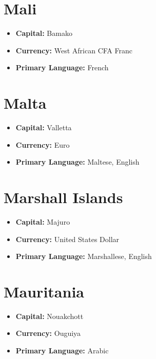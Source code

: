 \documentclass[a4paper,100pt,twoside]{book}
\begin{document}
\section*{\Huge Mali}
\vspace{5mm} %
\begin{itemize}
	\item \textbf{Capital:} Bamako
	\item \textbf{Currency:} West African CFA Franc
	\item \textbf{Primary Language:} French
\end{itemize}

\section*{\Huge Malta}
\vspace{5mm} %
\begin{itemize}
	\item \textbf{Capital:} Valletta
	\item \textbf{Currency:} Euro
	\item \textbf{Primary Language:} Maltese, English
\end{itemize}

\section*{\Huge Marshall Islands}
\vspace{5mm} %
\begin{itemize}
	\item \textbf{Capital:} Majuro
	\item \textbf{Currency:} United States Dollar
	\item \textbf{Primary Language:} Marshallese, English
\end{itemize}

\section*{\Huge Mauritania}
\vspace{5mm} %
\begin{itemize}
	\item \textbf{Capital:} Nouakchott
	\item \textbf{Currency:} Ouguiya
	\item \textbf{Primary Language:} Arabic
\end{itemize}
\end{document}
